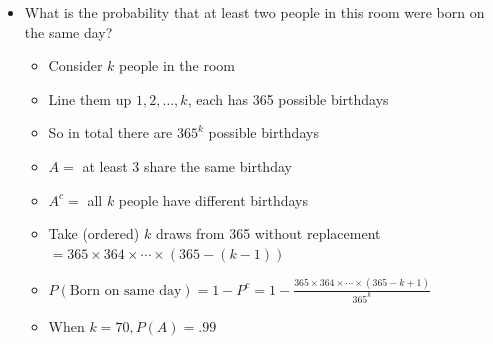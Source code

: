\documentclass{article}
\begin{document}
\begin{itemize}
\begin{itemize}
        \item $P(\text{same number}) = P(\text{2 chips of \#1}) + \cdots + P(\text{2 chips of \#n}) = n \cdot \frac{\binom{3}{2}}{\binom{3n}{2}} = \frac{n \cdot 3! (3n-2)! 2!}{2! 1! 3n!} = \frac{2}{3n - 1}$
        \item $P(\text{same color or same number}) = \frac{2+n-1}{3n-1} = \frac{n+1}{3n-1}$
    \end{itemize}
    \item What is the probability that at least two people in this room were born on the same day?
    \begin{itemize}
        \item Consider $k$ people in the room
        \item Line them up $1,2,\dots, k$, each has 365 possible birthdays
        \item So in total there are $365^k$ possible birthdays
        \item $A =$ at least 3 share the same birthday
        \item $A^c =$ all $k$ people have different birthdays
        \item Take (ordered) $k$ draws from 365 without replacement $=365 \times 364 \times \cdots \times (365-(k-1))$
        \item $P(\text{Born on same day}) = 1 - P^c = 1 - \frac{365 \times 364 \times \cdots \times (365 - k +1)}{365^k}$
        \item When $k=70, P(A)=.99$
    \end{itemize}

\end{itemize}
\end{document}
